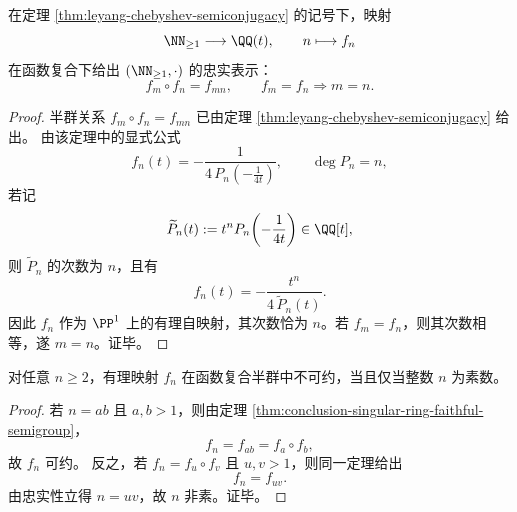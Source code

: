 \begin{theorem}\label{thm:conclusion-singular-ring-faithful-semigroup}
在定理 \ref{thm:leyang-chebyshev-semiconjugacy} 的记号下，映射
\[
\NN_{\ge 1}\longrightarrow \QQ(t),\qquad
n\longmapsto f_n
\]
在函数复合下给出 \((\NN_{\ge 1},\cdot)\) 的忠实表示：
\[
f_m\circ f_n=f_{mn},
\qquad
f_m=f_n\Longrightarrow m=n.
\]
\end{theorem}
\begin{proof}
半群关系 \(f_m\circ f_n=f_{mn}\) 已由定理 \ref{thm:leyang-chebyshev-semiconjugacy} 给出。
由该定理中的显式公式
\[
f_n(t)=-\frac{1}{4\,P_n\!\left(-\frac{1}{4t}\right)},
\qquad
\deg P_n=n,
\]
若记
\[
\widetilde P_n(t):=t^nP_n\!\left(-\frac{1}{4t}\right)\in \QQ[t],
\]
则 \(\widetilde P_n\) 的次数为 \(n\)，且有
\[
f_n(t)=-\frac{t^n}{4\,\widetilde P_n(t)}.
\]
因此 \(f_n\) 作为 \(\PP^1\) 上的有理自映射，其次数恰为 \(n\)。若 \(f_m=f_n\)，则其次数相等，遂 \(m=n\)。证毕。
\end{proof}

\begin{corollary}[复合不可约元与算术素数的一致性]\label{cor:conclusion-singular-ring-prime-composition-irreducibility}
对任意 \(n\ge 2\)，有理映射 \(f_n\) 在函数复合半群中不可约，当且仅当整数 \(n\) 为素数。
\end{corollary}
\begin{proof}
若 \(n=ab\) 且 \(a,b>1\)，则由定理 \ref{thm:conclusion-singular-ring-faithful-semigroup}，
\[
f_n=f_{ab}=f_a\circ f_b,
\]
故 \(f_n\) 可约。
反之，若 \(f_n=f_u\circ f_v\) 且 \(u,v>1\)，则同一定理给出
\[
f_n=f_{uv}.
\]
由忠实性立得 \(n=uv\)，故 \(n\) 非素。证毕。
\end{proof}


